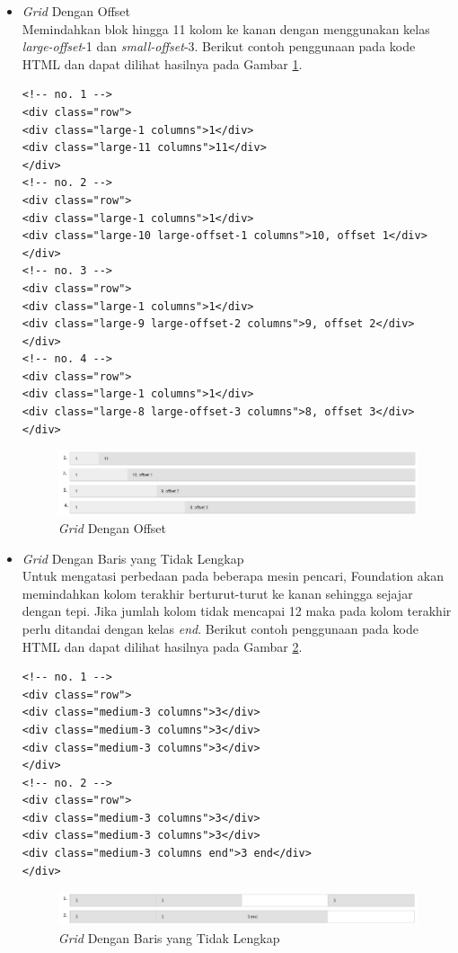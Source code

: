 \begin{itemize}
\begin{itemize}
\begin{enumerate}[(1)]
\begin{itemize}
\item {\it Grid} Dengan Offset\\
Memindahkan blok hingga 11 kolom ke kanan dengan menggunakan kelas
{\it large-offset}-1 dan {\it small-offset}-3. Berikut contoh penggunaan pada
kode HTML dan dapat dilihat hasilnya pada Gambar \ref{fig:gridoffset}.
\begin{lstlisting}[basicstyle=\footnotesize]
<!-- no. 1 -->
<div class="row">
<div class="large-1 columns">1</div>
<div class="large-11 columns">11</div>
</div>
<!-- no. 2 -->
<div class="row">
<div class="large-1 columns">1</div>
<div class="large-10 large-offset-1 columns">10, offset 1</div>
</div>
<!-- no. 3 -->
<div class="row">
<div class="large-1 columns">1</div>
<div class="large-9 large-offset-2 columns">9, offset 2</div>
</div>
<!-- no. 4 -->
<div class="row">
<div class="large-1 columns">1</div>
<div class="large-8 large-offset-3 columns">8, offset 3</div>
</div>
\end{lstlisting}
\begin{figure}[H]
\centering
\includegraphics[scale=0.6]{Gambar/gridoffset.png}
\caption[{\it Grid} Dengan Offset]{{\it Grid} Dengan Offset}
\label{fig:gridoffset}
\end{figure}
\item {\it Grid} Dengan Baris yang Tidak Lengkap\\
Untuk mengatasi perbedaan pada beberapa mesin pencari, Foundation akan
memindahkan kolom terakhir berturut-turut ke kanan sehingga sejajar dengan
tepi. Jika jumlah kolom tidak mencapai 12 maka pada kolom terakhir perlu
ditandai dengan kelas {\it end}. Berikut contoh penggunaan pada
kode HTML dan dapat dilihat hasilnya pada Gambar \ref{fig:gridtidaklengkap}.
\begin{lstlisting}[basicstyle=\footnotesize]
<!-- no. 1 -->
<div class="row">
<div class="medium-3 columns">3</div>
<div class="medium-3 columns">3</div>
<div class="medium-3 columns">3</div>
</div>
<!-- no. 2 -->
<div class="row">
<div class="medium-3 columns">3</div>
<div class="medium-3 columns">3</div>
<div class="medium-3 columns end">3 end</div>
</div>
\end{lstlisting}
\begin{figure}[H]
\centering
\includegraphics[scale=0.6]{Gambar/gridtidaklengkap.png}
\caption[{\it Grid} Dengan Baris yang Tidak Lengkap]{{\it Grid} Dengan Baris
yang Tidak Lengkap}
\label{fig:gridtidaklengkap}
\end{figure}


\end{itemize}
\end{enumerate}
\end{itemize}
\end{itemize}
